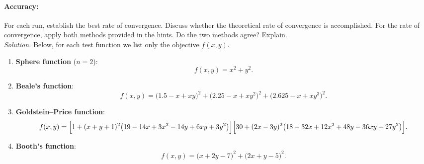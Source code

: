 \documentclass[11pt]{article}
\begin{document}
	\paragraph{Accuracy:} For each run, establish the best rate of convergence. Discuss whether the theoretical rate of convergence is accomplished. For the rate of convergence, apply both methods provided in the hints. Do the two methods agree? Explain.\\
	
	\textit{Solution.} Below, for each test function we list only the objective \(f(x,y)\).
	
	\begin{enumerate}[label=\alph*)]
		\item \textbf{Sphere function} ($n=2$):
		\[
		f(x,y)=x^{2}+y^{2}.
		\]
		\item \textbf{Beale’s function}:
		\[
		f(x,y)=\bigl(1.5 - x + x y\bigr)^{2}
		+\bigl(2.25 - x + x y^{2}\bigr)^{2}
		+\bigl(2.625 - x + x y^{3}\bigr)^{2}.
		\]
		\item \textbf{Goldstein–Price function}:
		\[
		f(x,y)=\Bigl[1+(x+y+1)^{2}\bigl(19-14x+3x^{2}-14y+6xy+3y^{2}\bigr)\Bigr]
		\Bigl[30+(2x-3y)^{2}\bigl(18-32x+12x^{2}+48y-36xy+27y^{2}\bigr)\Bigr].
		\]
		\item \textbf{Booth’s function}:
		\[
		f(x,y)=\bigl(x+2y-7\bigr)^{2}+\bigl(2x+y-5\bigr)^{2}.
		\]
	\end{enumerate}
\end{document}
